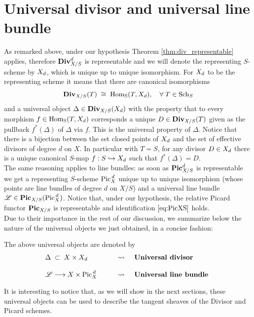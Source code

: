 \section{Universal divisor and universal line bundle}
	As remarked above, under our hypothesis Theorem \ref{thm:div_representable} applies, therefore $\operatorname{\mathbf{Div}}_{X/S}^d$ is representable and we will denote the representing $S$-scheme by $X_d$, which is unique up to unique isomorphism. For $X_d$ to be the representing scheme it means that there are canonical isomorphisms
	$$ \operatorname{\mathbf{Div}}_{X/S}(T) \;\cong\; \operatorname{Hom_S}(T,X_d), \quad \forall \;T\in \operatorname{Sch}_S $$
	and a universal object $\Delta \in \operatorname{\mathbf{Div}}_{X/S}(X_d)$ with the property that to every morphism $f\in \operatorname{Hom_S}(T,X_d)$ corresponds a unique $D\in \operatorname{\mathbf{Div}}_{X/S}(T)$ given as the pullback $f^*(\Delta)$ of $\Delta$ via $f$. This is the universal property of $\Delta$. 
	Notice that there is a bijection between the set closed points of $X_d$ and the set of effective divisors of degree $d$ on $X$. In particular with $T=S$, for any divisor $D\in X_d$ there is a unique canonical $S$-map $f:S\hookrightarrow X_d$ such that $f^*(\Delta) = D$.\\

	The same reasoning applies to line bundles: as soon as $\operatorname{\mathbf{Pic}}_{X/S}^d$ is representable we get a representing $S$-scheme $\operatorname{Pic}^{\,d}_X$ unique up to unique isomorphism (whose points are line bundles of degree $d$ on $X/S$) and a universal line bundle $\mathscr{L} \in \operatorname{\mathbf{Pic}}_{X/S}(\operatorname{Pic}^{\,d}_X)$. Notice that, under our hypothesis, the relative Picard functor $\operatorname{\mathbf{Pic}}_{X/S}$ is representable and identification $\eqref{eq:PicXS}$ holds.\\

	Due to their importance in the rest of our discussion, we summarize below the nature of the universal objects we just obtained, in a concise fashion: 
	\begin{notation}
		The above universal objects are denoted by
		$$
			\begin{array}{ l c l }
				\Delta\;\subset\; X\times X_d \qquad &\leadsto& \textbf{ Universal divisor }
				\\\\
				\mathscr{L} \longrightarrow X\times \operatorname{Pic}^{\,d}_X \qquad &\leadsto& \textbf{ Universal line bundle }
			\end{array}
		$$
	\end{notation}\vspace{1em}
	It is interesting to notice that, as we will show in the next sections, these universal objects can be used to describe the tangent sheaves of the Divisor and Picard schemes.\vspace{1em}

